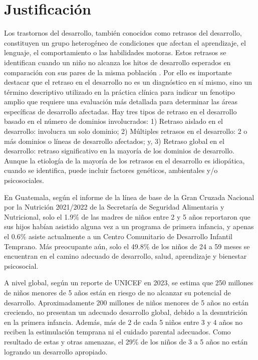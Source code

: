 \documentclass[11pt,letterpaper]{report}
\begin{document}
	\chapter{Justificación}
Los trastornos del desarrollo, también conocidos como retrasos del desarrollo,
constituyen un grupo heterogéneo de condiciones que afectan el aprendizaje, el
lenguaje, el comportamiento o las habilidades motoras.
\cite{cdcDevelopmentalDisability} Estos retrasos se identifican cuando un niño
no alcanza los hitos de desarrollo esperados en comparación con sus pares de la
misma población \cite{DevelopmentalSurveillance}. Por ello es importante
destacar que el retraso en el desarrollo no es un diagnóstico en sí mismo, sino
un término descriptivo utilizado en la práctica clínica para indicar un
fenotipo amplio que requiere una evaluación más detallada para determinar las
áreas específicas de desarrollo afectadas. Hay tres tipos de retraso en el
desarrollo basado en el número de dominios involucrados: 1) Retraso aislado en
el desarrollo: involucra un solo dominio; 2) Múltiples retrasos en el
desarrollo: 2 o más dominios o líneas de desarrollo afectados; y, 3) Retraso
global en el desarrollo: retraso significativo en la mayoría de los dominios de
desarrollo. \cite{Bellman2013} Aunque la etiología de la mayoría de los
retrasos en el desarrollo es idiopática, cuando se identifica, puede incluir
factores genéticos, ambientales y/o psicosociales. \cite{DevelopmentalDelay}

En Guatemala, según el informe de la línea de base de la Gran Cruzada Nacional
por la Nutrición 2021/2022 de la Secretaría de Seguridad Alimentaria y
Nutricional, solo el 1.9\% de las madres de niños entre 2 y 5 años reportaron
que sus hijos habían asistido alguna vez a un programa de primera infancia, y
apenas el 0.6\% asiste actualmente a un Centro Comunitario de Desarrollo
Infantil Temprano. Más preocupante aún, solo el 49.8\% de los niños de 24 a 59
meses se encuentran en el camino adecuado de desarrollo, salud, aprendizaje y
bienestar psicosocial. \cite{SESAN2022}

A nivel global, según un reporte de UNICEF en 2023, se estima que 250 millones
de niños menores de 5 años están en riesgo de no alcanzar su potencial de
desarrollo. Aproximadamente 200 millones de niños menores de 5 años no están
creciendo, no presentan un adecuado desarrollo global, debido a la desnutrición
en la primera infancia. Además, más de 2 de cada 5 niños entre 3 y 4 años no
reciben la estimulación temprana ni el cuidado parental adecuados. Como
resultado de estas y otras amenazas, el 29\% de los niños de 3 a 5 años no
están logrando un desarrollo apropiado. \cite{UNICEF2023}
\end{document}
